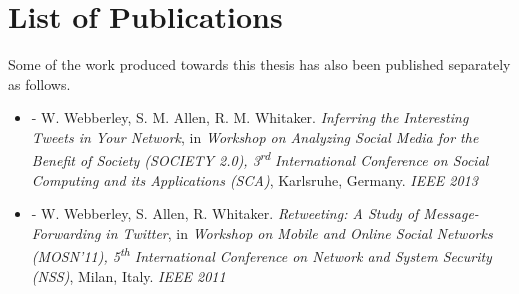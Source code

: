 \newpage
\chapter*{List of Publications}

Some of the work produced towards this thesis has also been published separately as follows.

\begin{itemize} 

\item \cite{webberley13} - W. Webberley, S. M. Allen, R. M. Whitaker. \textit{Inferring the Interesting Tweets in Your Network}, 
			in \textit{Workshop on Analyzing Social Media for the Benefit of Society (SOCIETY 2.0), 3\textsuperscript{rd} International Conference on Social Computing and its Applications (SCA)},
			Karlsruhe, Germany. \textit{IEEE 2013} 

\item \cite{webberley11} - W. Webberley, S. Allen, R. Whitaker. \textit{Retweeting: A Study of Message-Forwarding in Twitter}, 
			in \textit{Workshop on Mobile and Online Social Networks (MOSN'11), 5\textsuperscript{th} International Conference on Network and System Security (NSS)},
			Milan, Italy. \textit{IEEE 2011}

\end{itemize}
